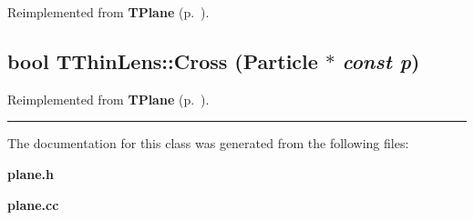 Reimplemented from {\bf TPlane} {\rm (p.~\pageref{TPlane_a2})}.\label{TThinLens_a2}
\subsection{\setlength{\rightskip}{0pt plus 5cm}bool TThin\-Lens::Cross ({\bf Particle} $\ast$ {\em const p})\hspace{0.3cm}{\tt  [virtual]}}



Reimplemented from {\bf TPlane} {\rm (p.~\pageref{TPlane_a4})}.\vspace{0.4cm}\hrule\vspace{0.2cm}
The documentation for this class was generated from the following files:\begin{CompactItemize}
\item 
{\bf plane.h}\item 
{\bf plane.cc}\end{CompactItemize}
